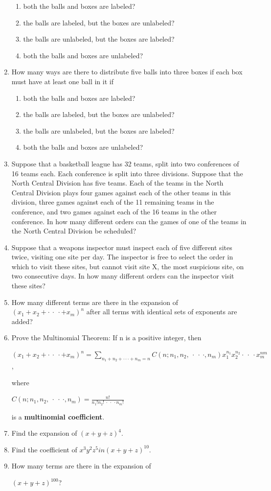 \documentclass[11pt,a4paper]{book}
\newcommand{\onestaritem}{\refstepcounter{enumi}\item[$*$\theenumi.]}
\begin{document}
\begin{enumerate}
\begin{enumerate}[label=(\alph*)]
\item both the balls and boxes are labeled?
\item the balls are labeled, but the boxes are unlabeled?
\item the balls are unlabeled, but the boxes are labeled?
\item both the balls and boxes are unlabeled?
\end{enumerate}
\item How many ways are there to distribute five balls into three boxes if each box must have at least one ball in it if
\begin{enumerate}[label=(\alph*)]
\item both the balls and boxes are labeled?
\item the balls are labeled, but the boxes are unlabeled?
\item the balls are unlabeled, but the boxes are labeled?
\item both the balls and boxes are unlabeled?
\end{enumerate}
\item Suppose that a basketball league has 32 teams, split into two conferences of 16 teams each.
Each conference is split into three divisions.
Suppose that the North Central Division has five teams.
Each of the teams in the North Central Division plays four games against each of the other teams in this division, three games against each of the 11 remaining teams in the conference, and two games against each of the 16 teams in the other conference.
In how many different orders can the games of one of the teams in the North Central Division be scheduled?
\onestaritem Suppose that a weapons inspector must inspect each of five different sites twice, visiting one site per day.
The inspector is free to select the order in which to visit these sites, but cannot visit site X, the most suspicious site, on two consecutive days.
In how many different orders can the inspector visit these sites?
\item How many different terms are there in the expansion of $(x_1 + x_2 +\cdot~\cdot~\cdot+x_m)^{n}$ after all terms with identical sets of exponents are added?
\onestaritem Prove the Multinomial Theorem: If n is a positive integer, then

$(x_1 + x_2 +\cdot~\cdot~\cdot+x_m)^{n} = \sum_{n_1+n_2 +\cdot\cdot\cdot+n_m = n} C(n; n_1, n_2,~\cdot~\cdot~\cdot, n_m)x^{n_1}_1x^{n_2}_2\cdot~\cdot~\cdot x^{nm}_m$,

where

$C(n; n_1, n_2,~\cdot~\cdot~\cdot, n_m) = \frac{n!}{n_1!n_2!~\cdot~\cdot~\cdot n_m!}$

is a \textbf{multinomial coefficient}.
\item Find the expansion of $(x + y + z)^{4}$.
\item Find the coefficient of $x^{3}y^{2}z^{5} in (x + y + z)^{10}$.
\item How many terms are there in the expansion of 

$(x + y + z)^{100}$?
\end{enumerate}
\end{document}
